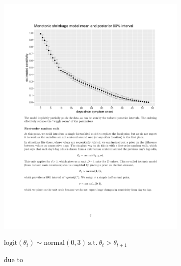 \documentclass[9pt]{report}
\begin{document}

\includegraphics[width=0.7\textwidth]{img/monotonicity-bayes.pdf}
\vspace*{-3pt}
\begin{subitemize}
\item $\textrm{logit}(\theta_t) \sim \textrm{normal}(0, 3) \
  \textrm{s.t.} \ \theta_t > \theta_{t+1}$
\item {} due to 
\end{subitemize}

  
\end{document}
